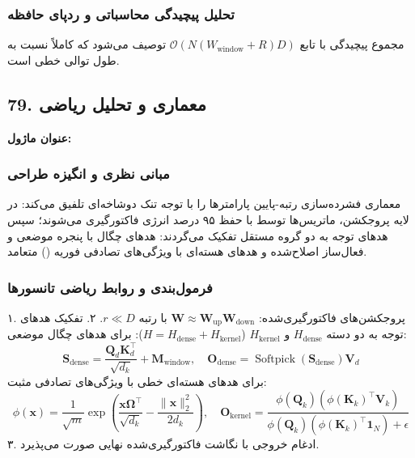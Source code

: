\subsubsection*{تحلیل پیچیدگی محاسباتی و ردپای حافظه}
مجموع پیچیدگی با تابع $\mathcal{O}(N (W_{\text{window}} + R) D)$ توصیف می‌شود که کاملاً نسبت به طول توالی خطی است.


\subsection*{79. معماری و تحلیل ریاضی }
\textbf{عنوان ماژول:} 

\subsubsection*{مبانی نظری و انگیزه طراحی}
معماری  فشرده‌سازی رتبه-پایین پارامترها را با توجه تنک دوشاخه‌ای تلفیق می‌کند: در لایه پروجکشن، ماتریس‌ها توسط  با حفظ ۹۵ درصد انرژی فاکتورگیری می‌شوند؛ سپس هدهای توجه به دو گروه مستقل تفکیک می‌گردند: هدهای چگال با پنجره موضعی و فعال‌ساز اصلاح‌شده  و هدهای هسته‌ای با ویژگی‌های تصادفی فوریه () متعامد.

\subsubsection*{فرمول‌بندی و روابط ریاضی تانسورها}
۱. پروجکشن‌های فاکتورگیری‌شده: $\mathbf{W} \approx \mathbf{W}_{\text{up}} \mathbf{W}_{\text{down}}$ با رتبه $r \ll D$.
۲. تفکیک هدهای توجه به دو دسته $H_{\text{dense}}$ و $H_{\text{kernel}}$ ($H = H_{\text{dense}} + H_{\text{kernel}}$):
برای هدهای چگال موضعی:
\begin{equation}
\mathbf{S}_{\text{dense}} = \frac{\mathbf{Q}_d \mathbf{K}_d^\top}{\sqrt{d_k}} + \mathbf{M}_{\text{window}}, \quad \mathbf{O}_{\text{dense}} = \operatorname{Softpick}(\mathbf{S}_{\text{dense}}) \mathbf{V}_d
\end{equation}
برای هدهای هسته‌ای خطی با ویژگی‌های تصادفی مثبت:
\begin{equation}
\phi(\mathbf{x}) = \frac{1}{\sqrt{m}} \exp\left(\frac{\mathbf{x} \mathbf{\Omega}^\top}{\sqrt{d_k}} - \frac{\|\mathbf{x}\|_2^2}{2 d_k}\right), \quad \mathbf{O}_{\text{kernel}} = \frac{\phi(\mathbf{Q}_k) \left( \phi(\mathbf{K}_k)^\top \mathbf{V}_k \right)}{\phi(\mathbf{Q}_k) \left( \phi(\mathbf{K}_k)^\top \mathbf{1}_N \right) + \epsilon}
\end{equation}
۳. ادغام خروجی با نگاشت فاکتورگیری‌شده نهایی صورت می‌پذیرد.


